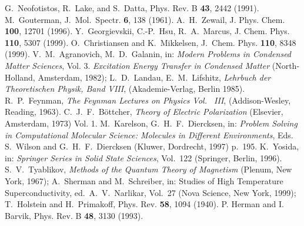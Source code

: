 \documentclass[12pt,twoside,a4paper]{report}
\begin{document}
{\begin{thebibliography}{999}

      G.~Neofotistos, R.~Lake, and  S.~Datta, { Phys. Rev. B} {\bf 43}, 2442 (1991).
  M.~Gouterman, J.~Mol.~Spectr. {\bf 6}, 138 (1961).
  A.~H.~Zewail, J. Phys. Chem. {\bf 100}, 12701 (1996).
 Y.~Georgievskii, C.-P.~Hsu, R.~A.~Marcus,
                   {J. Chem. Phys.}  {\bf 110}, 5307 (1999). 
  O.~Christiansen and K.~Mikkelsen, J.~Chem. Phys. {\bf 110}, 8348 (1999).
     V.~M.~Agranovich, M.~D.~Galanin, in:
                  {\it  Modern Problems in Condensed Matter Sciences},
                  Vol. 3. {\it Excitation Energy Transfer in Condensed Matter}
                  (North-Holland, Amsterdam, 1982);
                  L.~D.~Landau, E.~M.~Lifshitz, {\it Lehrbuch der Theoretischen
                  Physik, Band VIII}, (Akademie-Verlag, Berlin 1985).
                  R.~P.~Feynman, {\it The Feynman Lectures on Physics Vol. ~III}, 
                  (Addison-Wesley, Reading, 1963).
 C.~J.~F.~B\"ottcher, {\it Theory of Electric Polarization}
                  (Elsevier, Amsterdam, 1973) Vol. 1.
 M.~Karelson, G.~H.~F.~Diercksen, in: 
                   {\it Problem Solving in Computational Molecular Science: 
                   Molecules in Different Environments},
                   Eds. S.~Wilson and G.~H.~F.~Diercksen 
                   (Kluwer, Dordrecht, 1997) p.~195. 
  K.~Yosida, in: {\it Springer Series in Solid State Sciences},
                  Vol.~122 (Springer, Berlin, 1996).
  S.~V.~Tyablikov, 
                  {\it Methods of the Quantum Theory of Magnetism}
                  (Plenum, New York, 1967);
                  A.~Sherman and M.~Schreiber, in:
                  {Studies of High Temperature Superconductivity},
                  ed.~A.~V.~Narlikar, Vol.~27 
                  (Nova Science, New York, 1999);
                  T.~Holstein and H.~Primakoff, 
                  Phys. Rev. {\bf 58}, 1094 (1940).
  P. Herman and I. Barvik, Phys. Rev. B {\bf 48}, 3130 (1993).



\end{thebibliography}}
\end{document}
